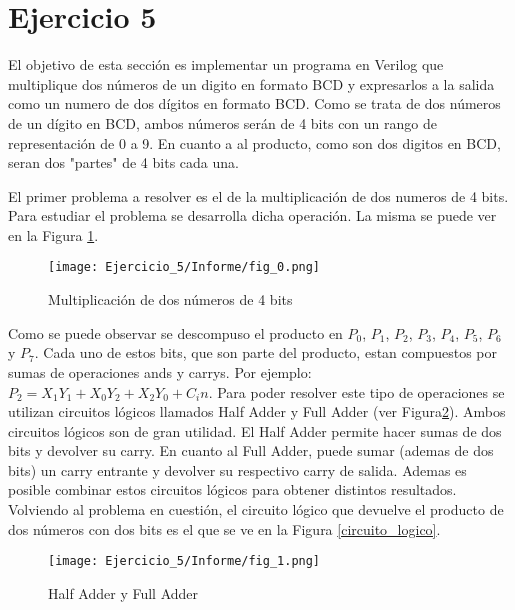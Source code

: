 \section{Ejercicio 5}


El objetivo de esta sección es implementar un programa en Verilog que multiplique dos números de un digito en formato BCD y expresarlos a la salida como un numero de dos dígitos en formato BCD. Como se trata
de dos números de un dígito en BCD, ambos números serán de 4 bits con un rango de representación de 0 a 9. En cuanto a al producto, como son dos digitos en BCD, seran dos "partes" de 4 bits cada una. 

El primer problema a resolver es el de la multiplicación de dos numeros de 4 bits. Para estudiar el problema se desarrolla dicha operación. La misma se puede ver en la Figura \ref{multiplicacion}. 


\begin{figure}[ht]                                                       
    \centering\texttt{[image: Ejercicio\_5/Informe/fig\_0.png]}
     \caption{Multiplicación de dos números de 4 bits}
     \label{multiplicacion}
     \end{figure}

Como se puede observar se descompuso el producto en $P_0$, $P_1$, $P_2$, $P_3$, $P_4$, $P_5$, $P_6$ y $P_7$. Cada uno de estos bits, que son parte del producto, estan compuestos por sumas de operaciones 
ands y carrys. Por ejemplo: $P_2 = X_1Y_1 + X_0Y_2 + X_2Y_0 + C_in$. Para poder resolver este tipo de operaciones se utilizan circuitos lógicos llamados Half Adder y Full Adder (ver Figura\ref{full_adder}). Ambos circuitos 
lógicos son de gran utilidad. El Half Adder permite hacer sumas de dos bits y devolver su carry. En cuanto al Full Adder, puede sumar (ademas de dos bits) un carry entrante y devolver su respectivo
carry de salida.  Ademas es posible combinar estos circuitos lógicos para obtener distintos resultados.
Volviendo al problema en cuestión, el circuito lógico que devuelve el producto de dos números con dos bits es el que se ve en la Figura \ref{circuito_logico}.


\begin{figure}[h!]                                                       
    \centering\texttt{[image: Ejercicio\_5/Informe/fig\_1.png]}
     \caption{Half Adder y Full Adder}
     \label{full_adder}
     \end{figure}



